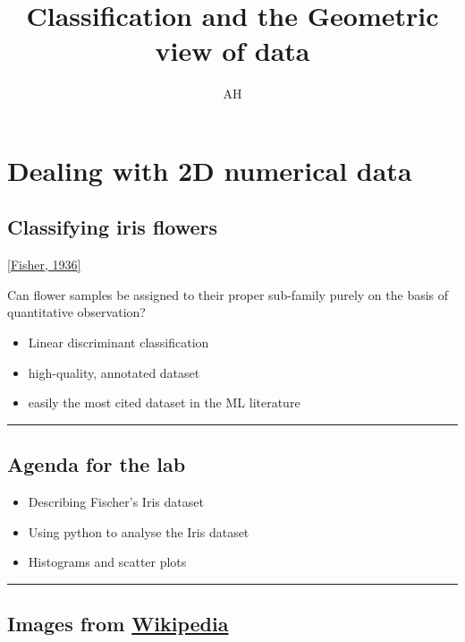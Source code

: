 \documentclass[
  letterpaper,
  DIV=11,
  numbers=noendperiod]{scrartcl}
\title{Classification and the Geometric view of data}
\author{AH}
\date{}
\begin{document}
\maketitle

\section{Dealing with 2D numerical
data}\label{dealing-with-2d-numerical-data}

\subsection{Classifying iris flowers}\label{classifying-iris-flowers}

\href{https://onlinelibrary.wiley.com/doi/abs/10.1111/j.1469-1809.1936.tb02137.x}{{[}Fisher,
1936{]}}

Can flower samples be assigned to their proper sub-family purely on the
basis of quantitative observation?

\begin{itemize}
\item
  Linear discriminant classification
\item
  high-quality, annotated dataset
\item
  easily the most cited dataset in the ML literature
\end{itemize}

\begin{center}\rule{0.5\linewidth}{0.5pt}\end{center}

\subsection{Agenda for the lab}\label{agenda-for-the-lab}

\begin{itemize}
\item
  Describing Fischer's Iris dataset
\item
  Using python to analyse the Iris dataset
\item
  Histograms and scatter plots
\end{itemize}

\begin{center}\rule{0.5\linewidth}{0.5pt}\end{center}

\subsection{\texorpdfstring{Images from
\href{https://en.wikipedia.org/wiki/Iris_flower_data_set}{Wikipedia}}{Images from Wikipedia}}\label{images-from-wikipedia}
\end{document}
